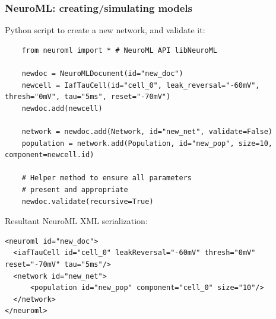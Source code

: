 \begin{frame}[fragile,c]
  \frametitle{NeuroML: creating/simulating models}
  Python script to create a new network, and validate it:
    \begin{verbatim}
    from neuroml import * # NeuroML API libNeuroML

    newdoc = NeuroMLDocument(id="new_doc")
    newcell = IafTauCell(id="cell_0", leak_reversal="-60mV", thresh="0mV", tau="5ms", reset="-70mV")
    newdoc.add(newcell)

    network = newdoc.add(Network, id="new_net", validate=False)
    population = network.add(Population, id="new_pop", size=10, component=newcell.id)

    # Helper method to ensure all parameters
    # present and appropriate
    newdoc.validate(recursive=True)
    \end{verbatim}
    Resultant NeuroML XML serialization:
    \begin{verbatim}
<neuroml id="new_doc">
  <iafTauCell id="cell_0" leakReversal="-60mV" thresh="0mV" reset="-70mV" tau="5ms"/>
  <network id="new_net">
      <population id="new_pop" component="cell_0" size="10"/>
  </network>
</neuroml>
    \end{verbatim}
\end{frame}
